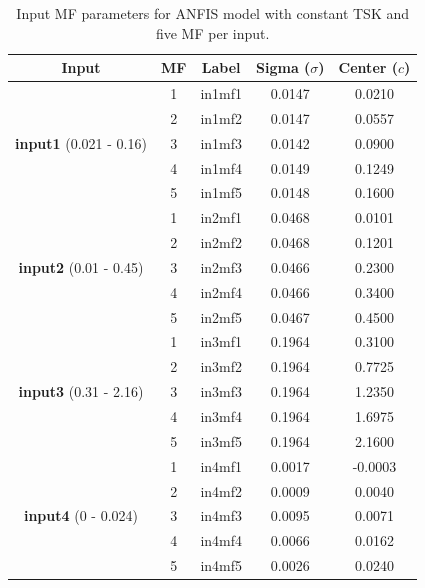 \documentclass[12pt]{article}
\begin{document}
\begin{table}[H]
\centering
\begin{tabular}{|c|c|c|c|c|}
\hline
\textbf{Input} & \textbf{MF} & \textbf{Label} & \textbf{Sigma ($\sigma$)} & \textbf{Center ($c$)} \\ \hline
\multirow{5}{*}{\textbf{input1} (0.021 - 0.16)} 
 & 1 & in1mf1 & 0.0147 & 0.0210 \\ \cline{2-5} 
 & 2 & in1mf2 & 0.0147 & 0.0557 \\ \cline{2-5} 
 & 3 & in1mf3 & 0.0142 & 0.0900 \\ \cline{2-5} 
 & 4 & in1mf4 & 0.0149 & 0.1249 \\ \cline{2-5} 
 & 5 & in1mf5 & 0.0148 & 0.1600 \\ \hline
\hline
\multirow{5}{*}{\textbf{input2} (0.01 - 0.45)} 
 & 1 & in2mf1 & 0.0468 & 0.0101 \\ \cline{2-5} 
 & 2 & in2mf2 & 0.0468 & 0.1201 \\ \cline{2-5} 
 & 3 & in2mf3 & 0.0466 & 0.2300 \\ \cline{2-5} 
 & 4 & in2mf4 & 0.0466 & 0.3400 \\ \cline{2-5} 
 & 5 & in2mf5 & 0.0467 & 0.4500 \\ \hline
\hline
\multirow{5}{*}{\textbf{input3} (0.31 - 2.16)} 
 & 1 & in3mf1 & 0.1964 & 0.3100 \\ \cline{2-5} 
 & 2 & in3mf2 & 0.1964 & 0.7725 \\ \cline{2-5} 
 & 3 & in3mf3 & 0.1964 & 1.2350 \\ \cline{2-5} 
 & 4 & in3mf4 & 0.1964 & 1.6975 \\ \cline{2-5} 
 & 5 & in3mf5 & 0.1964 & 2.1600 \\ \hline
\hline
\multirow{5}{*}{\textbf{input4} (0 - 0.024)} 
 & 1 & in4mf1 & 0.0017 & -0.0003 \\ \cline{2-5} 
 & 2 & in4mf2 & 0.0009 & 0.0040 \\ \cline{2-5} 
 & 3 & in4mf3 & 0.0095 & 0.0071 \\ \cline{2-5} 
 & 4 & in4mf4 & 0.0066 & 0.0162 \\ \cline{2-5} 
 & 5 & in4mf5 & 0.0026 & 0.0240 \\ \hline
\end{tabular}
\caption{Input MF parameters for ANFIS model with constant TSK and five MF per input. }
\end{table}
\end{document}

